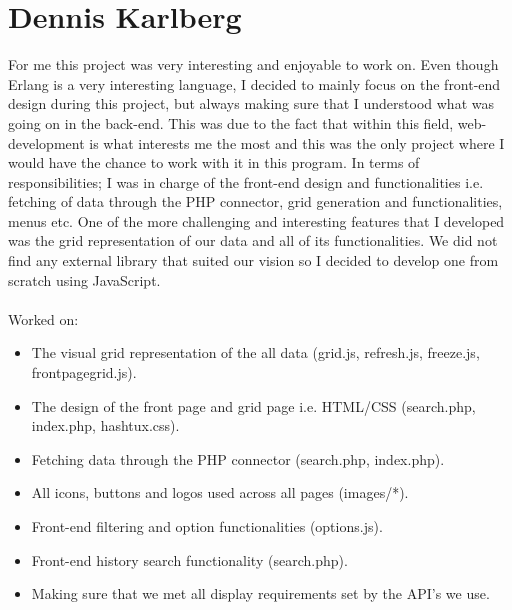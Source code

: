 \section{Dennis Karlberg}
For me this project was very interesting and enjoyable to work on. Even though
Erlang is a very interesting language, I decided to mainly focus on the
front-end design during this project, but always making sure that I understood
what was going on in the back-end. This was due to the fact that within this
field, web-development is what interests me the most and this was the only
project where I would have the chance to work with it in this program. In terms
of responsibilities; I was in charge of the front-end design and functionalities
i.e. fetching of data through the PHP connector, grid generation and
functionalities, menus etc. One of the more challenging and interesting features
that I developed was the grid representation of our data and all of its
functionalities. We did not find any external library that suited our vision so
I decided to develop one from scratch using JavaScript. \\ \\
Worked on:
\begin{itemize}
  \item The visual grid representation of the all data (grid.js, refresh.js,
        freeze.js, frontpagegrid.js).
  \item The design of the front page and grid page i.e. HTML/CSS (search.php,
        index.php, hashtux.css).
  \item Fetching data through the PHP connector (search.php, index.php).
  \item All icons, buttons and logos used across all pages (images/*).
  \item Front-end filtering and option functionalities (options.js).
  \item Front-end history search functionality (search.php).
  \item Making sure that we met all display requirements set by the API's we
        use.
\end{itemize}
\newpage

